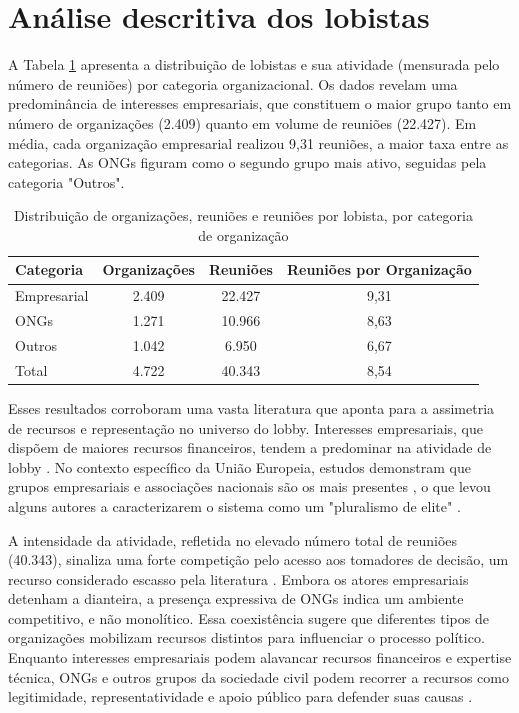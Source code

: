 \section{Análise descritiva dos lobistas}
\label{sec:resultados_descritica_lobistas}
A Tabela \ref{tab:dist_orgs_reunioes} apresenta a distribuição de lobistas e sua atividade (mensurada pelo número de reuniões) por categoria organizacional. Os dados revelam uma predominância de interesses empresariais, que constituem o maior grupo tanto em número de organizações (2.409) quanto em volume de reuniões (22.427). Em média, cada organização empresarial realizou 9,31 reuniões, a maior taxa entre as categorias. As ONGs figuram como o segundo grupo mais ativo, seguidas pela categoria "Outros".

\begin{table}[!htbp]
\centering
\caption{Distribuição de organizações, reuniões e reuniões por lobista, por categoria de organização}
\label{tab:dist_orgs_reunioes}
\begin{tabular}{lccc}
\hline
Categoria & Organizações & Reuniões & Reuniões por Organização \\
\hline
Empresarial & 2.409 & 22.427 & 9,31 \\
ONGs & 1.271 & 10.966 & 8,63 \\
Outros & 1.042 & 6.950 & 6,67 \\
\hline
Total & 4.722 & 40.343 & 8,54 \\
\hline  
\end{tabular}
\end{table}

Esses resultados corroboram uma vasta literatura que aponta para a assimetria de recursos e representação no universo do lobby. Interesses empresariais, que dispõem de maiores recursos financeiros, tendem a predominar na atividade de lobby \cite{de_figueiredo_advancing_2014}. No contexto específico da União Europeia, estudos demonstram que grupos empresariais e associações nacionais são os mais presentes \cite{dur20212wholobbies, eising2007institutional}, o que levou alguns autores a caracterizarem o sistema como um "pluralismo de elite" \cite{coen1997evolution, schmidt2006procedural}.

A intensidade da atividade, refletida no elevado número total de reuniões (40.343), sinaliza uma forte competição pelo acesso aos tomadores de decisão, um recurso considerado escasso pela literatura \cite{hall1990buying}. Embora os atores empresariais detenham a dianteira, a presença expressiva de ONGs indica um ambiente competitivo, e não monolítico. Essa coexistência sugere que diferentes tipos de organizações mobilizam recursos distintos para influenciar o processo político. Enquanto interesses empresariais podem alavancar recursos financeiros e expertise técnica, ONGs e outros grupos da sociedade civil podem recorrer a recursos como legitimidade, representatividade e apoio público para defender suas causas \cite{Coen2019, dur_measuring_2008}.

